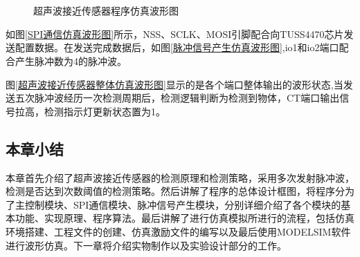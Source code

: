     
      \begin{figure}[ht]
      	\centering
  		\\
	\centering
	\\

	\caption{超声波接近传感器程序仿真波形图}
	\label{超声波接近传感器程序仿真波形图}
\end{figure}


    如图\ref{SPI通信仿真波形图}所示，NSS、SCLK、MOSI引脚配合向TUSS4470芯片发送配置数据。在发送完成数据后，如图\ref{脉冲信号产生仿真波形图},io1和io2端口配合产生脉冲数为4的脉冲波。\par
    图\ref{超声波接近传感器整体仿真波形图}显示的是各个端口整体输出的波形状态,当发送五次脉冲波经历一次检测周期后，检测逻辑判断为检测到物体，CT端口输出信号拉高，检测指示灯更新状态置为1。\par
    \subsection{本章小结}
    本章首先介绍了超声波接近传感器的检测原理和检测策略，采用多次发射脉冲波，检测是否达到次数阈值的检测策略。然后讲解了程序的总体设计框图，将程序分为了主控制模块、SPI通信模块、脉冲信号产生模块，分别详细介绍了各个模块的基本功能、实现原理、程序算法。最后讲解了进行仿真模拟所进行的流程，包括仿真环境搭建、工程文件的创建、仿真激励文件的编写以及最后使用MODELSIM软件进行波形仿真。下一章将介绍实物制作以及实验设计部分的工作。
    